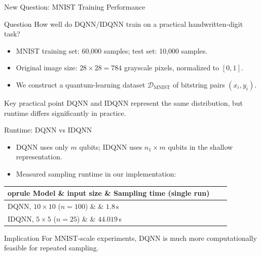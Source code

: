 \documentclass[aspectratio=169]{beamer}
\begin{document}
\begin{frame}{New Question: MNIST Training Performance}
  \begin{block}{Question}
    How well do DQNN/IDQNN train on a practical handwritten-digit task?
  \end{block}

  \begin{itemize}
    \item MNIST training set: 60,000 samples; test set: 10,000 samples.
    \item Original image size: $28\times28=784$ grayscale pixels, normalized to $[0,1]$.
    \item We construct a quantum-learning dataset $\mathcal D_{\mathrm{MNIST}}$ of bitstring pairs $(x_i,y_i)$.
  \end{itemize}

  \begin{alertblock}{Key practical point}
    DQNN and IDQNN represent the same distribution, but runtime differs significantly in practice.
  \end{alertblock}
\end{frame}

\begin{frame}{Runtime: DQNN vs IDQNN}
  \small
  \begin{itemize}
    \item DQNN uses only $m$ qubits; IDQNN uses $n_1\times m$ qubits in the shallow representation.
    \item Measured sampling runtime in our implementation:
  \end{itemize}

  \vspace{0.4em}
  \centering
  \begin{tabular}{lcc}
    	oprule
    Model \& input size \& Sampling time (single run) \\
    \midrule
    DQNN, $10\times10$ ($n=100$) \& \& $1.8\,$s \\
    IDQNN, $5\times5$ ($n=25$) \& \& $44.019\,$s \\
    \bottomrule
  \end{tabular}

  \vspace{0.4em}
  \begin{block}{Implication}
    For MNIST-scale experiments, DQNN is much more computationally feasible for repeated sampling.
  \end{block}
\end{frame}
\end{document}
